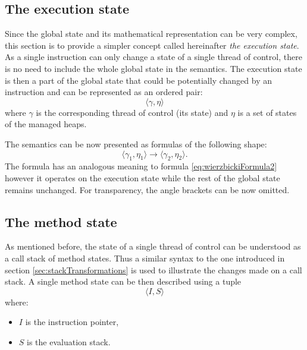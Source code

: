 \documentclass{article}
\numberwithin{equation}{section}
\begin{document}
\subsection{The execution state}

Since the global state and its mathematical representation can be very complex, this section is to provide a simpler concept called hereinafter \textit{the execution state}. As a single instruction can only change a state of a single thread of control, there is no need to include the whole global state in the semantics. The execution state is then a part of the global state that could be potentially changed by an instruction and can be represented as an ordered pair:
\begin{equation}
\label{eq:executionState}
	\langle\gamma, \eta\rangle
\end{equation}
where $\gamma$ is the corresponding thread of control (its state) and $\eta$ is a set of states of the managed heaps.

The semantics can be now presented as formulas of the following shape:
\begin{equation}
\label{eq:simpleSemantics}
	\langle\gamma_1, \eta_1\rangle \rightarrow \langle\gamma_2, \eta_2\rangle.
\end{equation}
The formula has an analogous meaning to formula \ref{eq:wierzbickiFormula2} however it operates on the execution state while the rest of the global state remains unchanged. For transparency, the angle brackets can be now omitted.

\subsection{The method state}

As mentioned before, the state of a single thread of control can be understood as a call stack of method states. Thus a similar syntax to the one introduced in section \ref{sec:stackTransformations} is used to illustrate the changes made on a call stack. A single method state can be then described using a tuple
\begin{equation}
\label{eq:methodState}
	\langle I, S \rangle
\end{equation}
where:
\begin{itemize}
	\item{$I$ is the instruction pointer},
	\item{$S$ is the evaluation stack}.
\end{itemize}
\end{document}
